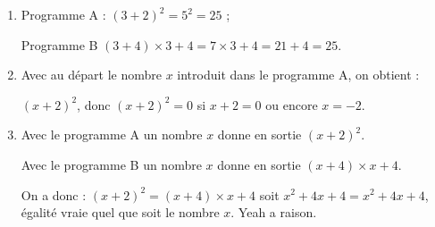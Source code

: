 
\medskip

%
%

\begin{enumerate}
\item %
Programme A : $(3 + 2)^2 = 5^2 = 25$ ;

Programme B $(3 + 4) \times 3 + 4 = 7 \times 3 + 4 = 21 + 4 = 25$.
\item %
Avec au départ le nombre $x$ introduit dans le programme A, on obtient :

$(x + 2)^2$, donc $(x + 2)^2 = 0$ si $x + 2 = 0$ ou encore $x = - 2$.
\item %

Avec le programme A un nombre $x$ donne en sortie $(x + 2)^2$.

Avec le programme B un nombre $x$ donne en sortie $(x + 4) \times x + 4$.

On a donc : $(x + 2)^2 = (x + 4) \times x + 4$ soit $x^2 + 4x + 4 = x^2 + 4x + 4$, égalité vraie quel que soit le nombre $x$. Yeah a raison.
\end{enumerate}

\vspace{0,5cm}

